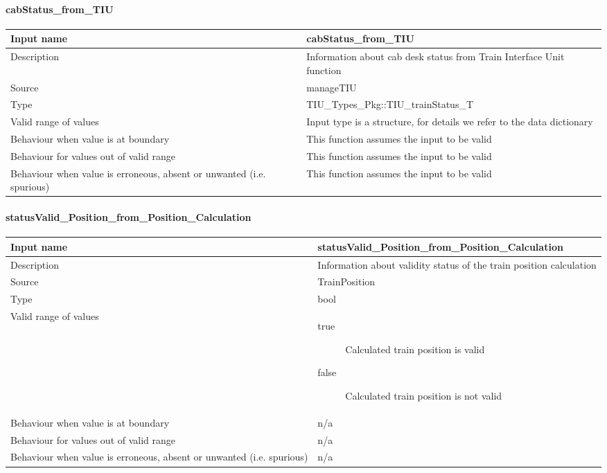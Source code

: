 \paragraph{cabStatus\_from\_TIU}

\begin{longtable}{p{}p{}}
\toprule
Input name				& cabStatus\_from\_TIU  \\
\midrule
Description				& Information about cab desk status from Train Interface Unit function \\
\midrule
Source					&  manageTIU\\ 
\midrule
Type					& TIU\_Types\_Pkg::TIU\_trainStatus\_T \\
\midrule
Valid range of values	& Input type is a structure, for details we refer to the data dictionary \\
\midrule
Behaviour when value is at boundary	& This function assumes the input to be valid \\
\midrule
Behaviour for values out of valid range	& This function assumes the input to be valid\\
\midrule
Behaviour when value is erroneous, absent or unwanted (i.e. spurious) & This function assumes the input to be valid \\
\bottomrule
\end{longtable}

\paragraph{statusValid\_Position\_from\_Position\_Calculation}

\begin{longtable}{p{}p{}}
\toprule
Input name				& statusValid\_Position\_from\_Position\_Calculation  \\
\midrule
Description				& Information about validity status of the train position calculation \\
\midrule
Source					&  TrainPosition\\ 
\midrule
Type					& bool \\
\midrule
Valid range of values	& \begin{description}
\item[true]Calculated train position is valid
\item[false]Calculated train position is not valid
\end{description} \\
\midrule
Behaviour when value is at boundary	& n/a \\
\midrule
Behaviour for values out of valid range	& n/a\\
\midrule
Behaviour when value is erroneous, absent or unwanted (i.e. spurious) & n/a \\
\bottomrule
\end{longtable}

